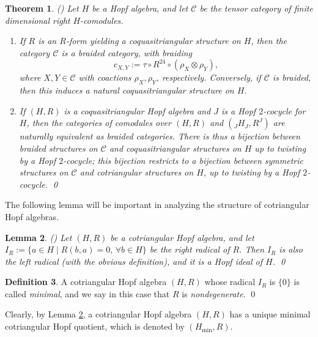 \documentclass{amsart}
\numberwithin{equation}{section}
\newtheorem{theorem}{Theorem}[section]
\newtheorem{lemma}[theorem]{Lemma}
\theoremstyle{definition}
\newtheorem{definition}[theorem]{Definition}
\begin{document}
\begin{theorem}\label{cotri} {\rm (\cite[p. 200--202]{EGNO})} 
Let $H$ be a Hopf algebra, and let $\mathcal{C}$ be the tensor category of finite dimensional right $H$-comodules.
\begin{enumerate}
\item If $R$ is an $R$-form yielding a coquasitriangular structure on $H$, then the category $\mathcal{C}$ is a braided category, with braiding
\begin{equation}\label{braid} c_{X,Y}:= \tau \circ R^{24} \circ (\rho_X \otimes \rho_Y), 
\end{equation}
where $X,Y\in \mathcal{C}$ with coactions $\rho_X,\rho_Y$, respectively. Conversely, if $\mathcal{C}$ is braided, then this induces a natural coquasitriangular structure on $H$.

\item If $(H,R)$ is a coquasitriangular Hopf algebra and $J$ is a Hopf $2$-cocycle for $H$, then the categories of comodules over $(H,R)$ and $({}_J H_J, R^J)$ are naturally equivalent as braided categories. There is thus a bijection between braided structures on $\mathcal{C}$ and coquasitriangular structures on $H$ up to twisting by a Hopf $2$-cocycle; this bijection restricts to a bijection between symmetric structures on $\mathcal{C}$ and cotriangular structures on $H$, up to twisting by a Hopf $2$-cocycle. \qed
\end{enumerate}
\end{theorem}

The following lemma will be important in analyzing the structure of cotriangular Hopf algebras.

\begin{lemma}\label{radical}{\rm (\cite[Proposition 2.1]{G1})} 
Let $(H,R)$ be a cotriangular Hopf algebra, and let 
$I_R:=\{a \in H \mid R(b,a) = 0, \, \forall b \in H \}$ be 
the right radical of $R$. Then $I_R$ is also the left radical (with the obvious definition), and it is a Hopf ideal of $H$. \qed
\end{lemma}

\begin{definition}\label{min} A cotriangular Hopf algebra $(H,R)$ whose radical $I_R$ is $\{0\}$ is called \emph{minimal}, and we say in this case that $R$ is \emph{nondegenerate}. \qed
\end{definition}

Clearly, by Lemma \ref{radical}, a cotriangular Hopf algebra $(H,R)$ has a unique minimal cotriangular Hopf quotient, which is denoted by $(H_{\mathrm{min}}, R)$. 
\end{document}
